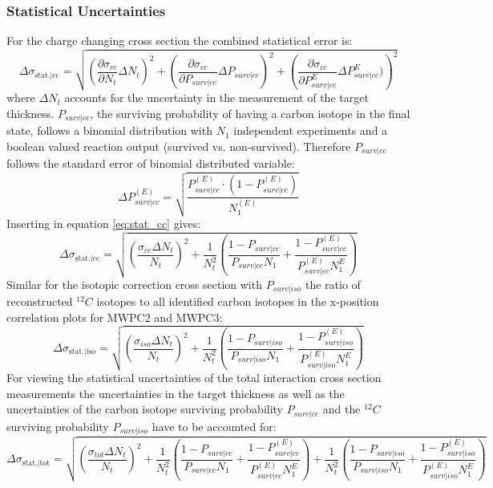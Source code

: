 \subsubsection{Statistical Uncertainties}
For the charge changing cross section the combined  statistical error is:\newline
\begin{equation}\label{eq:stat_cc}
\Delta\sigma_\text{stat.|cc} = \sqrt{\left(\frac{\partial \sigma_{cc}}{\partial N_t} \Delta N_t\right)^2 + \left(\frac{\partial \sigma_{cc}}{\partial P_{surv|cc}} \Delta P_{surv|cc}\right)^2 + \left(\frac{\partial \sigma_{cc}}{\partial P^{E}_{surv|cc}} \Delta P^{E}_{surv|cc})\right)^2}
\end {equation}
where $\Delta N_t$ accounts for the uncertainty in the measurement of the target thickness. $P_{surv|cc}$, the surviving probability of having a carbon isotope in the final state, follows a binomial distribution with $N_1$ independent experiments and a boolean valued reaction output (survived vs. non-survived). Therefore $P_{surv|cc}$ follows the standard error of binomial distributed variable:
\begin{equation}
\Delta P^{(E)}_{surv|cc} = \sqrt{\frac{P^{(E)}_{surv|cc}\cdot (1-P^{(E)}_{surv|cc})}{N^{(E)}_{1}}}
\end{equation}
Inserting in equation \ref{eq:stat_cc} gives:
\begin{equation}
\Delta\sigma_\text{stat.|cc} = \sqrt{\left(\frac{\sigma_{cc} \Delta N_t}{N_t}\right)^2 + \frac{1}{N_t^2} \left(\frac{1 - P_{surv|cc}}{P_{surv|cc} N_1} + \frac{1 - P^{(E)}_{surv|cc}}{P^{(E)}_{surv|cc} N_1^E}\right)}
\end{equation}
Similar for the isotopic correction cross section with $P_{surv|iso}$ the ratio of reconstructed $^{12}C$ isotopes to all identified carbon isotopes  in the x-position  correlation plots for MWPC2 and MWPC3: 
\begin{equation}
\Delta\sigma_\text{stat.|iso} = \sqrt{\left(\frac{\sigma_{iso} \Delta N_t}{N_t}\right)^2 + \frac{1}{N_t^2} \left(\frac{1 - P_{surv|iso}}{P_{surv|iso} N_1} + \frac{1 - P^{(E)}_{surv|iso}}{P^{(E)}_{surv|iso} N_1^E}\right)}
\end{equation}
For viewing the statistical uncertainties of the total interaction cross section measurements the uncertainties in the target thickness as well as the uncertainties of the carbon isotope surviving probability $P_{surv|cc}$  and the $^{12}C$ surviving probability $P_{surv|iso}$ have to be accounted for:
\small
\begin{equation}
\Delta\sigma_\text{stat.|tot} = \sqrt{\left(\frac{\sigma_{tot} \Delta N_t}{N_t}\right)^2 + \frac{1}{N_t^2} \left(\frac{1 - P_{surv|cc}}{P_{surv|cc} N_1} + \frac{1 - P^{(E)}_{surv|cc}}{P^{(E)}_{surv|cc} N_1^E}\right)  + \frac{1}{N_t^2} \left(\frac{1 - P_{surv|iso}}{P_{surv|iso} N_1} + \frac{1 - P^{(E)}_{surv|iso}}{P^{(E)}_{surv|iso} N_1^E}\right)}
\end{equation}
\normalsize
